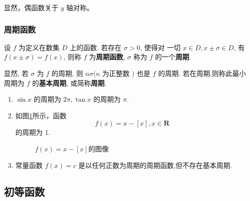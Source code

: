 显然，偶函数关于 $y$ 轴对称。


\subsubsection{周期函数}

\begin{definition}[周期函数]
    设 $f$ 为定义在数集 $D$ 上的函数. 若存在 $\sigma>0$, 使得对 一切 $x\in D, x \pm \sigma \in D$, 有 $f(x \pm \sigma)=f(x)$, 则称 $f$ 为\textcolor{third}{\bf 周期函数}, $\sigma$ 称为 $f$ 的一个\textcolor{third}{\bf 周期}. 
\end{definition}

显然, 若 $\sigma$ 为 $f$ 的周期, 则 $n \sigma(n$ 为正整数 $)$ 也是 $f$ 的周期. 若在周期,则称此最小周期为 $f$ 的\textcolor{third}{\bf 基本周期}, 或简称\textcolor{third}{\bf 周期}.

\begin{exercise}

    \begin{enumerate}
        \item $\sin x$ 的周期为 $2 \pi, \tan x$ 的周期为 $\pi$.
    
        \item 如图\ref{fig:f(x)=x-[x]的图像}所示，函数
        $$
        f(x)=x-[x], x \in \mathbf{R}
        $$
        的周期为 1. 

\begin{figure}[!h]
\centering
{}
\caption{$f(x)=x-[x]$的图像}
\label{fig:f(x)=x-[x]的图像}
\end{figure}

\item 常量函数 $f(x)=c$ 是以任何正数为周期的周期函数,但不存在基本周期.
        \end{enumerate}
\end{exercise}

\subsection{初等函数}

